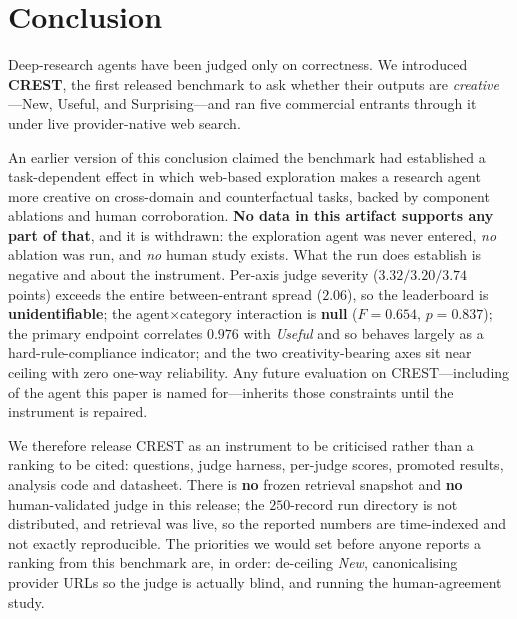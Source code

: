 \section{Conclusion}
\label{sec:conclusion}

Deep-research agents have been judged only on correctness. We introduced \textbf{CREST}, the first
released benchmark to ask whether their outputs are \emph{creative}---New, Useful, and
Surprising---and ran five commercial entrants through it under live provider-native web search.

An earlier version of this conclusion claimed the benchmark had established a task-dependent effect
in which web-based exploration makes a research agent more creative on cross-domain and
counterfactual tasks, backed by component ablations and human corroboration. \textbf{No data in this
artifact supports any part of that}, and it is withdrawn: the exploration agent was never entered,
\emph{no} ablation was run, and \emph{no} human study exists. What the run does establish is negative and
about the instrument. Per-axis judge severity ($3.32/3.20/3.74$ points) exceeds the entire
between-entrant spread ($2.06$), so the leaderboard is \textbf{unidentifiable}; the
agent$\times$category interaction is \textbf{null} ($F=0.654$, $p=0.837$); the primary endpoint
correlates $0.976$ with \emph{Useful} and so behaves largely as a hard-rule-compliance indicator;
and the two creativity-bearing axes sit near ceiling with zero one-way reliability. Any future
evaluation on CREST---including of the agent this paper is named for---inherits those constraints
until the instrument is repaired.

We therefore release CREST as an instrument to be criticised rather than a ranking to be cited:
questions, judge harness, per-judge scores, promoted results, analysis code and datasheet. There is
\textbf{no} frozen retrieval snapshot and \textbf{no} human-validated judge in this release; the
$250$-record run directory is not distributed, and retrieval was live, so the reported numbers are
time-indexed and not exactly reproducible. The priorities we would set before anyone reports a
ranking from this benchmark are, in order: de-ceiling \emph{New}, canonicalising provider URLs so
the judge is actually blind, and running the human-agreement study.
